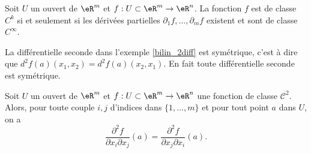\begin{proposition} \label{PropDYKooHvrfGw}
    Soit $U$ un ouvert de $\eR^m$ et  $f:U\subset\eR^m\to \eR^n$. La fonction $f$ est de classe $C^k$ si et seulement si les dérivées partielles $\partial_1 f, \ldots, \partial_m f $ existent et sont de classe $C^{\infty}$. 
\end{proposition}
La différentielle seconde dans l'exemple  \ref{bilin_2diff} est symétrique, c'est à dire que $d^2f(a)(x_1,x_2)=d^2f(a)(x_2,x_1)$. En fait toute différentielle seconde est symétrique.  


\begin{theorem}[Schwarz]\label{Schwarz}
 Soit $U$ un ouvert de $\eR^m$ et  $f:U\subset\eR^m\to \eR^n$ une fonction de classe $\mathcal{C}^2$. Alors, pour toute couple $i,j$ d'indices dans $\{1,\ldots, m\}$ et pour tout point $a$ dans $U$, on a 
\[
\frac{\partial^2 f}{\partial  x_i\partial x_j}(a)=\frac{\partial^2 f}{\partial  x_j\partial x_i}(a).
\]
\end{theorem}
